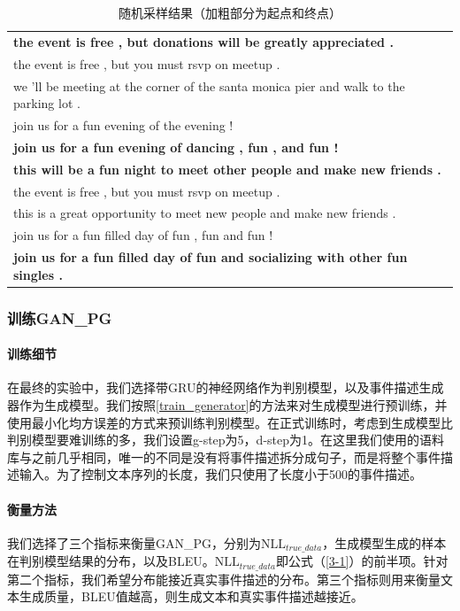 \documentclass[]{template}
\begin{document}
\begin{table}[htbp]
    \center
    \caption{\label{t3-3}随机采样结果（加粗部分为起点和终点）}
    \begin{tabular*}{\linewidth}{p{\linewidth}}
\toprule
\textbf{the event is free , but donations will be greatly appreciated .}\\
the event is free , but you must rsvp on meetup . \\
we 'll be meeting at the corner of the santa monica pier and walk to the parking lot .\\
join us for a fun evening of the evening !\\
\textbf{join us for a fun evening of dancing , fun , and fun !}\\
\midrule
\textbf{this will be a fun night to meet other people and make new friends .}\\
the event is free , but you must rsvp on meetup . \\
this is a great opportunity to meet new people and make new friends .\\
join us for a fun filled day of fun , fun and fun ! \\
\textbf{join us for a fun filled day of fun and socializing with other fun singles . }\\
\bottomrule
    \end{tabular*}
\end{table}

\subsubsection{训练GAN\_PG}
\paragraph{训练细节}
在最终的实验中，我们选择带GRU的神经网络作为判别模型，以及事件描述生成器作为生成模型。我们按照\ref{train_generator}的方法来对生成模型进行预训练，并使用最小化均方误差的方式来预训练判别模型。在正式训练时，考虑到生成模型比判别模型要难训练的多，我们设置g-step为5，d-step为1。在这里我们使用的语料库与之前几乎相同，唯一的不同是没有将事件描述拆分成句子，而是将整个事件描述输入。为了控制文本序列的长度，我们只使用了长度小于500的事件描述。
\paragraph{衡量方法}
我们选择了三个指标来衡量GAN\_PG，分别为$\mathrm{NLL}_{true\_data}$，生成模型生成的样本在判别模型结果的分布，以及BLEU\cite{papineni_bleu:_2002}。$\mathrm{NLL}_{true\_data}$即公式（\ref{3-1}）的前半项。针对第二个指标，我们希望分布能接近真实事件描述的分布。第三个指标则用来衡量文本生成质量，BLEU值越高，则生成文本和真实事件描述越接近。
\end{document}
